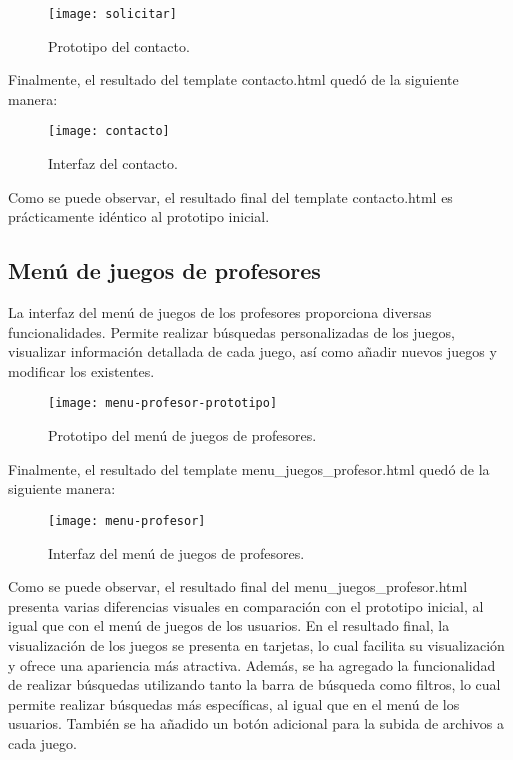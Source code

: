 \begin{figure}[htb]
\centering
\texttt{[image: solicitar]}
\caption{Prototipo del contacto.}
\label{fig:solicitar}
\end{figure}

Finalmente, el resultado del template contacto.html quedó de la siguiente manera:

\begin{figure}[htb]
\centering
\texttt{[image: contacto]}
\caption{Interfaz del contacto.}
\label{fig:contacto}
\end{figure}

Como se puede observar, el resultado final del template contacto.html es prácticamente idéntico al prototipo inicial. 

\subsection{Menú de juegos de profesores}
La interfaz del menú de juegos de los profesores proporciona diversas funcionalidades. Permite realizar búsquedas personalizadas de los juegos, visualizar información detallada de cada juego, así como añadir nuevos juegos y modificar los existentes.

\begin{figure}[htb]
\centering
\texttt{[image: menu-profesor-prototipo]}
\caption{Prototipo del menú de juegos de profesores.}
\label{fig:menu-profesor-prototipo}
\end{figure}

Finalmente, el resultado del template menu\_juegos\_profesor.html quedó de la siguiente manera:

\begin{figure}[htb]
\centering
\texttt{[image: menu-profesor]}
\caption{Interfaz del menú de juegos de profesores.}
\label{fig:menu-profesor}
\end{figure}

Como se puede observar, el resultado final del menu\_juegos\_profesor.html presenta varias diferencias visuales en comparación con el prototipo inicial, al igual que con el menú de juegos de los usuarios. En el resultado final, la visualización de los juegos se presenta en tarjetas, lo cual facilita su visualización y ofrece una apariencia más atractiva. Además, se ha agregado la funcionalidad de realizar búsquedas utilizando tanto la barra de búsqueda como filtros, lo cual permite realizar búsquedas más específicas, al igual que en el menú de los usuarios. También se ha añadido un botón adicional para la subida de archivos a cada juego.

